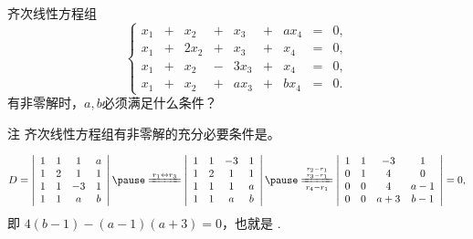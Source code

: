 \begin{frame}
  \begin{footnotesize}
    \begin{exampleblock}{33}
      齐次线性方程组
      $$
      \left\{
      \begin{array}{rcrcrcrcrc}
        x_1&+& x_2&+& x_3&+&ax_4&=&0,\\[0.1cm]
        x_1&+&2x_2&+& x_3&+& x_4&=&0,\\[0.1cm]
        x_1&+& x_2&-&3x_3&+& x_4&=&0,\\[0.1cm]
        x_1&+& x_2&+&ax_3&+&bx_4&=&0.
      \end{array}
      \right.
      $$
      有非零解时，$a,b$必须满足什么条件？
    \end{exampleblock}
    \pause 
    \begin{block}{注}
      齐次线性方程组有非零解的充分必要条件是。
    \end{block}
    \pause
    \jiename
    $$
    D = \left|
    \begin{array}{cccc}
      1&1&1&a\\
      1&2&1&1\\
      1&1&-3&1\\
      1&1&a&b\\
    \end{array}
    \right| \pause \xlongequal[]{r_1\leftrightarrow r_3}
    \left|
    \begin{array}{cccc}
      1&1&-3&1\\
      1&2&1&1\\
      1&1&1&a\\
      1&1&a&b\\
    \end{array}
    \right| \pause \xlongequal[r_4-r_1]{r_2-r_1 \atop r_3-r_1}
    \left|
    \begin{array}{cccc}
      1&1&-3&1\\
      0&1&4&0\\
      0&0&4&a-1\\
      0&0&a+3&b-1\\
    \end{array}
    \right| = 0,
    $$
    \pause
    即
    $4(b-1)-(a-1)(a+3)=0$，也就是
    .
  \end{footnotesize}
\end{frame}

